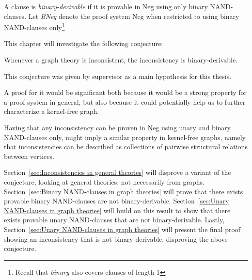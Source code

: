 

\begin{definition}
  A clause is \textit{binary-derivable} if it is provable in Neg using only binary NAND-clauses.
   Let \textit{BNeg} denote the proof system Neg when restricted to using binary NAND-clauses only\footnote{Recall that \textit{binary} also covers clauses of length 1}
\end{definition}
\begin{definition}
\end{definition}
This chapter will investigate the following conjecture:
\begin{conjecture}
  Whenever a graph theory is inconsistent, the inconsistency is binary-derivable.
\end{conjecture}
This conjecture was given by supervisor as a main hypothesis for this thesis.

A proof for it would be significant both because it would be a strong property for a proof system in general, but also because it could potentially help us to further characterize a kernel-free graph.

Having that any inconsistency can be proven in Neg using unary and binary NAND-clauses only, might imply a similar property in kernel-free graphs, namely that inconsistencies can be described as collections of pairwise structural relations between vertices.

Section~\ref{sec:Inconsistencies in general theories} will disprove a variant of the conjecture, looking at general theories, not necessarily from graphs.
Section~\ref{sec:Binary NAND-clauses in graph theories} will prove that there exists provable binary NAND-clauses are not binary-derivable.
Section~\ref{sec:Unary NAND-clauses in graph theories} will build on this result to show that there exists provable unary NAND-clauses that are not binary-derivable.
Lastly, Section~\ref{sec:Unary NAND-clauses in graph theories} will present the final proof showing an inconsistency that is not binary-derivable, disproving the above conjecture. 
